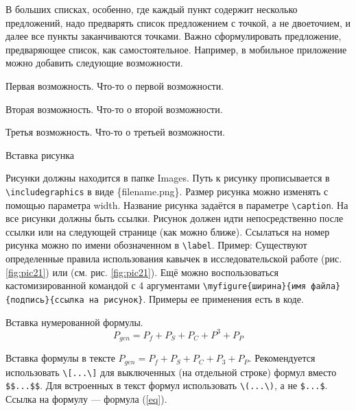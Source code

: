 \documentclass{report}
\begin{document}
В больших списках,  особенно, где каждый пункт содержит несколько 
предложений, надо предварять список предложением с точкой, а не двоеточием, и далее все пункты заканчиваются точками. Важно сформулировать предложение, предваряющее список, как самостоятельное. Например, в мобильное приложение можно добавить следующие возможности. 
\begin{enummarker}
\item Первая возможность. Что-то о первой возможности.
\item Вторая возможность. Что-то о второй возможности.
\item Третья возможность. Что-то о третьей возможности.
\end{enummarker}


Вставка рисунка

Рисунки должны находится в папке Images. Путь к рисунку прописывается в \verb|\includegraphics|  в виде \{filename.png\}. Размер рисунка можно изменять с помощью параметра width. Название рисунка задаётся в параметре \verb|\caption|. На все рисунки должны быть ссылки. Рисунок должен идти непосредственно после ссылки или на следующей странице (как можно ближе). Ссылаться на номер рисунка можно по имени обозначенном в \verb|\label|. Пример: Существуют определенные правила использования кавычек в исследовательской работе (рис. \ref{fig:pic21}) \break или (см. рис. \ref{fig:pic21}). Ещё можно воспользоваться кастомизированной командой с 4 аргументами \verb|\myfigure{ширина}{имя файла}{подпись}{ссылка на рисунок}|. Примеры ее применения есть в коде.



Вставка нумерованной формулы.
\begin{equation}
P_{gen}=P_{f} + P_S + P_C + P^3 + P_P
\label{eq}
\end{equation}

Вставка формулы в тексте \(P_{gen}=P_{f} + P_S + P_C + P_3 + P_P\). Рекомендуется использовать \verb|\[...\]| для выключенных (на отдельной строке) формул вместо \verb|$$...$$|.  Для встроенных в текст формул использовать  \verb|\(...\)|, а не \verb|$...$|. Ссылка на формулу --- формула (\ref{eq}).
\end{document}
